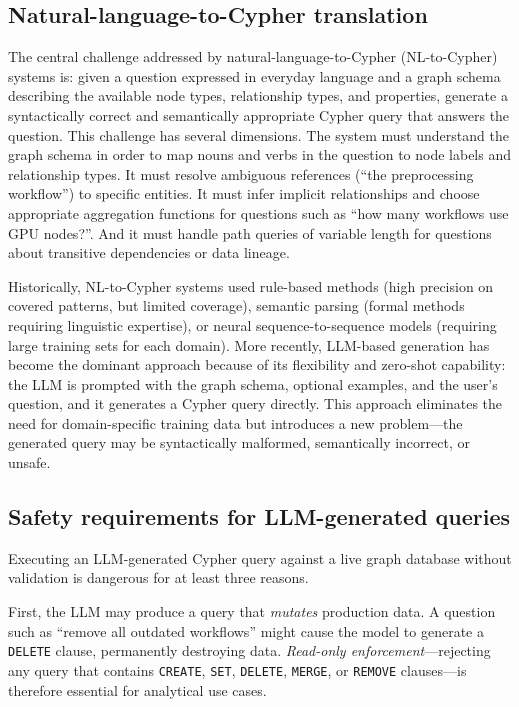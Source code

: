 \documentclass[a4paper,noexaminfo]{sapthesis}
\begin{document}
\subsection{Natural-language-to-Cypher translation}

The central challenge addressed by natural-language-to-Cypher
(NL-to-Cypher) systems is: given a question expressed in everyday language
and a graph schema describing the available node types, relationship types,
and properties, generate a syntactically correct and semantically
appropriate Cypher query that answers the question.  This challenge has
several dimensions.  The system must understand the graph schema in order to
map nouns and verbs in the question to node labels and relationship types.
It must resolve ambiguous references (``the preprocessing workflow'') to
specific entities.  It must infer implicit relationships and choose
appropriate aggregation functions for questions such as ``how many
workflows use GPU nodes?''.  And it must handle path queries of variable
length for questions about transitive dependencies or data lineage.

Historically, NL-to-Cypher systems used rule-based methods (high precision
on covered patterns, but limited coverage), semantic parsing (formal
methods requiring linguistic expertise), or neural sequence-to-sequence
models (requiring large training sets for each domain).  More recently,
LLM-based generation has become the dominant approach because of its
flexibility and zero-shot capability: the LLM is prompted with the graph
schema, optional examples, and the user's question, and it generates a
Cypher query directly.  This approach eliminates the need for
domain-specific training data but introduces a new problem---the generated
query may be syntactically malformed, semantically incorrect, or unsafe.

\subsection{Safety requirements for LLM-generated queries}

Executing an LLM-generated Cypher query against a live graph database
without validation is dangerous for at least three reasons.

First, the LLM may produce a query that \emph{mutates} production data.  A
question such as ``remove all outdated workflows'' might cause the model to
generate a \texttt{DELETE} clause, permanently destroying data.
\emph{Read-only enforcement}---rejecting any query that contains
\texttt{CREATE}, \texttt{SET}, \texttt{DELETE}, \texttt{MERGE}, or
\texttt{REMOVE} clauses---is therefore essential for analytical use cases.
\end{document}
